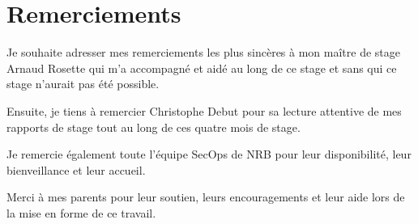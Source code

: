 
\chapter*{Remerciements} 

Je souhaite adresser mes remerciements les plus sincères à mon maître de stage Arnaud Rosette qui m'a accompagné et aidé au long de ce stage et sans qui ce stage n'aurait pas été possible.

Ensuite, je tiens à remercier Christophe Debut pour sa lecture attentive de mes rapports de stage tout au long de ces quatre mois de stage.

Je remercie également toute l'équipe SecOps de NRB pour leur disponibilité, leur bienveillance et leur accueil.

Merci à mes parents pour leur soutien, leurs encouragements et leur aide lors de la mise en forme de ce travail.

